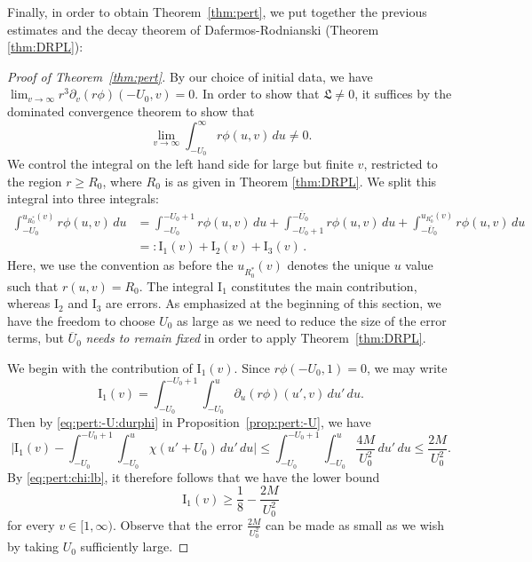 \documentclass[12 pt, reqno]{amsart}
\theoremstyle{definition}
\theoremstyle{remark}
\numberwithin{equation}{section}
\newcommand{\abs}[1]{\vert#1\vert}
\newcommand{\ud}{d}
\newcommand{\rd}{\partial}
\newcommand{\0}{\emptyset}
\newcommand{\f}{\frac}
\newcommand{\Ufree}{U_{0}}
\newcommand{\Ufixed}{\overline{U}_{0}}
\begin{document}
Finally, in order to obtain Theorem~\ref{thm:pert}, we put together the previous estimates and the decay theorem of Dafermos-Rodnianski (Theorem \ref{thm:DRPL}):

\begin{proof} [Proof of Theorem~\ref{thm:pert}]
By our choice of initial data, we have $\lim_{v \to \infty} r^{3} \rd_{v}(r \phi)(-\Ufree, v) = 0$. 
In order to show that $\mathfrak{L} \neq 0$, it suffices by the dominated convergence theorem to show that
 \begin{equation} \label{eq:pert:goal}
	\lim_{v \to \infty} \int_{-\Ufree}^{\infty} r \phi(u, v) \, \ud u \neq 0.
\end{equation}
We control the integral on the left hand side for large but finite $v$, restricted to the region $r\geq R_0$, where $R_0$ is as given in Theorem \ref{thm:DRPL}.  We split this integral into three integrals:
\begin{align*}
	\int_{-\Ufree}^{u_{R_0^*}(v)} r \phi(u, v) \, \ud u  
	&=  \int_{-\Ufree}^{-\Ufree+1} r \phi(u, v) \, \ud u + \int_{-\Ufree+1}^{-\Ufixed} r \phi(u, v) \, \ud u + \int_{-\Ufixed}^{u_{R_0^*}(v)} r \phi(u, v) \, \ud u \\
	&=: \mathrm{I}_{1}(v) + \mathrm{I}_{2}(v) + \mathrm{I}_{3}(v) \, .
\end{align*}
Here, we use the convention as before the $u_{R_0^*}(v)$ denotes the unique $u$ value such that $r(u,v)=R_0$. The integral $\mathrm{I}_{1}$ constitutes the main contribution, whereas $\mathrm{I}_{2}$ and $\mathrm{I}_{3}$ are errors. As emphasized at the beginning of this section, we have the freedom to choose $\Ufree$ as large as we need to reduce the size of the error terms, but $\Ufixed$ \emph{needs to remain fixed} in order to apply Theorem~\ref{thm:DRPL}.
 
We begin with the contribution of $\mathrm{I}_{1}(v)$. Since $r \phi(-\Ufree, 1) = 0$, we may write
\begin{equation*}
	\mathrm{I}_{1}(v) = \int_{-\Ufree}^{-\Ufree+1} \int_{-\Ufree}^{u} \rd_{u} (r \phi) (u', v) \, \ud u' \, \ud u.
\end{equation*} 
Then by \eqref{eq:pert:-U:durphi} in Proposition~\ref{prop:pert:-U}, we have
\begin{equation*} 
	\abs{\mathrm{I_{1}}(v) - \int_{-\Ufree}^{-\Ufree+1}\int_{-\Ufree}^{u}\chi(u'+\Ufree) \, \ud u' \, \ud u} \leq \int_{-\Ufree}^{-\Ufree+1} \int_{-\Ufree}^{u} \frac{4M}{\Ufree^{2}} \, \ud u' \, \ud u
	\leq \frac{2M}{\Ufree^{2}}.
\end{equation*}
By \eqref{eq:pert:chi:lb}, it therefore follows that we have the lower bound
\begin{equation} \label{eq:pert:I1}
	 \mathrm{I_{1}}(v) \geq \frac{1}{8} - \frac{2M}{\Ufree^{2}} 
\end{equation}
for every $v \in [1, \infty)$. Observe that the error $\f{2M}{\Ufree^2}$ can be made as small as we wish by taking $\Ufree$ sufficiently large.


\end{proof}
\end{document}
